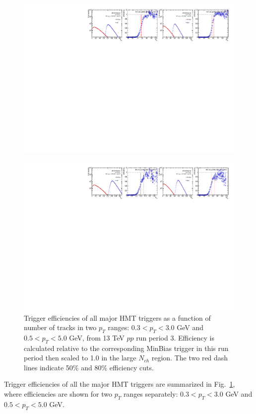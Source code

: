 \begin{figure}[H]
\centering
\includegraphics[width=1.\linewidth]{figs/sec_evtSlc/trigEff_pp13_run3/trigEff_Trig9.pdf}
\end{figure}
\begin{figure}[H]
\centering
\includegraphics[width=1.\linewidth]{figs/sec_evtSlc/trigEff_pp13_run3/trigEff_Trig11.pdf}
\caption{Trigger efficiencies of all major HMT triggers as a function of number of tracks in two $p_{T}$ ranges: $0.3<p_{T}<3.0$ GeV and $0.5<p_{T}<5.0$ GeV, from 13 TeV $pp$ run period 3. Efficiency is calculated relative to the corresponding MinBias trigger in this run period then scaled to 1.0 in the large $N_{ch}$ region. The two red dash lines indicate 50$\%$ and 80$\%$ efficiency cuts.}
\label{fig:trigEff_pp13_run3}
\end{figure}
Trigger efficiencies of all the major HMT triggers are summarized in Fig.~\ref{fig:trigEff_pp13_run3}, where efficiencies are shown for two $p_{T}$ ranges separately: $0.3<p_{T}<3.0$ GeV and $0.5<p_{T}<5.0$ GeV.



